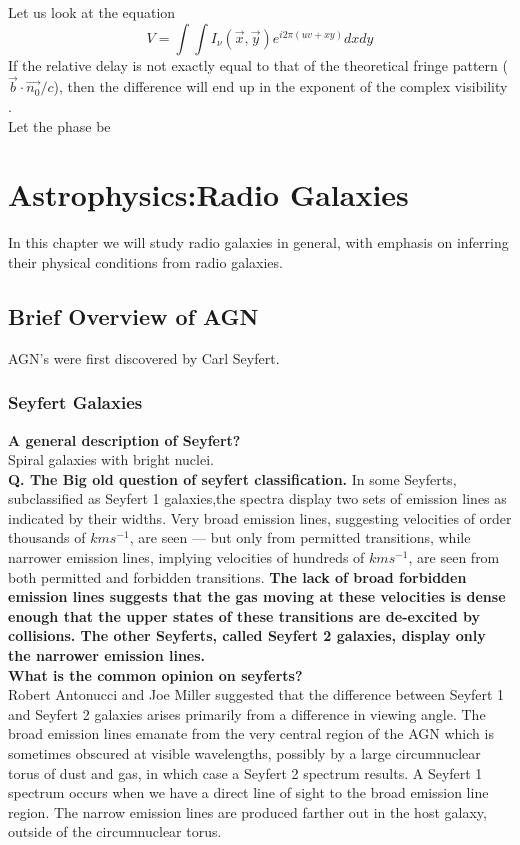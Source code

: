 \documentclass[10pt]{report}
\newcommand{\tbf}[1]{\textbf{#1}}
\begin{document}
Let us look at the equation
\begin{equation}
V=\int \int I_\nu (\vec{x},\vec{y})e^{i 2\pi (uv+xy)}dxdy
\end{equation}
If the relative delay is not exactly equal to that of the theoretical fringe pattern ($\vec{b}\cdot \vec{n_0}/c$), then the difference will end up in the exponent of the complex visibility .\\

Let the phase be 
 
\chapter{Astrophysics:Radio Galaxies}
In this chapter we will study radio galaxies in general, with emphasis on inferring their physical conditions from radio galaxies.\\
\section{Brief Overview of AGN}
AGN's were first discovered by Carl Seyfert.
\subsection{Seyfert Galaxies}
\tbf{A general description of Seyfert?}\\
Spiral galaxies with bright nuclei.\\

\tbf{Q. The Big old question of seyfert classification.}
 In some Seyferts, subclassified as Seyfert 1 galaxies,the spectra display two sets of emission lines as indicated by their widths. Very broad emission lines, suggesting velocities of order thousands of $km s^{-1}$, are seen — but only from permitted transitions, while narrower emission lines, implying velocities of hundreds of $km s^{-1}$, are seen from both permitted and forbidden transitions. \tbf{The lack of broad forbidden emission lines suggests that the gas moving at these velocities is dense enough that the upper states of these transitions are de-excited by collisions. The other Seyferts, called Seyfert 2 galaxies, display only the narrower emission lines.}\\
 
 \tbf{What is the common opinion on seyferts?}\\
 Robert Antonucci and Joe Miller suggested that the difference between Seyfert 1 and Seyfert 2 galaxies arises primarily from a difference in viewing angle. The broad emission lines emanate from the very central region of the AGN which is sometimes obscured at visible wavelengths, possibly by a large circumnuclear torus of dust and gas, in which case a Seyfert 2 spectrum results. A Seyfert 1 spectrum occurs when we have a direct line of sight to the broad emission line region. The narrow emission lines are produced farther out in the host galaxy, outside of the circumnuclear torus. \\
 
\end{document}

